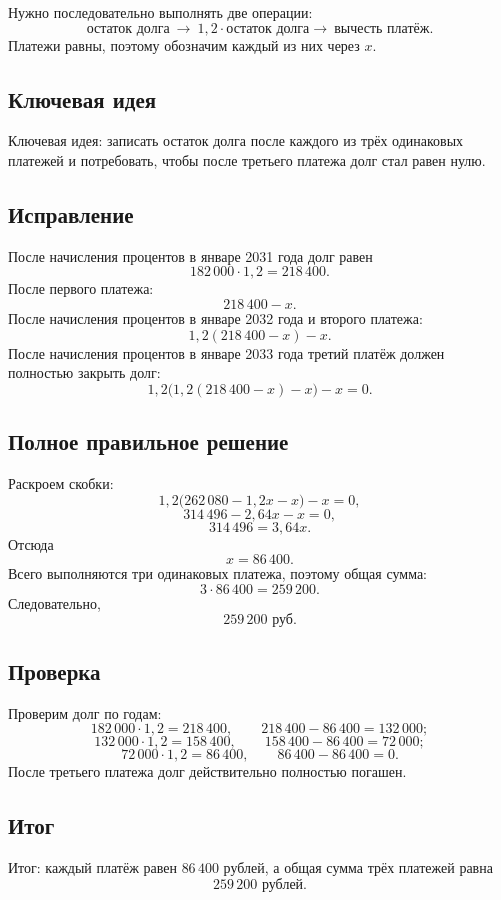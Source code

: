 \documentclass[12pt,a4paper]{article}
\begin{document}
Нужно последовательно выполнять две операции:
\[
\text{остаток долга}\ \longrightarrow\ 1{,}2\cdot\text{остаток долга}
\longrightarrow\ \text{вычесть платёж}.
\]
Платежи равны, поэтому обозначим каждый из них через $x$.

\subsection*{Ключевая идея}
\textcolor{blue!60!black}{Ключевая идея:} записать остаток долга после каждого из трёх одинаковых платежей и потребовать, чтобы после третьего платежа долг стал равен нулю.

\subsection*{Исправление}
После начисления процентов в январе 2031 года долг равен
\[
182\,000\cdot1{,}2=218\,400.
\]
После первого платежа:
\[
218\,400-x.
\]
После начисления процентов в январе 2032 года и второго платежа:
\[
1{,}2(218\,400-x)-x.
\]
После начисления процентов в январе 2033 года третий платёж должен полностью закрыть долг:
\[
1{,}2\bigl(1{,}2(218\,400-x)-x\bigr)-x=0.
\]

\subsection*{Полное правильное решение}
Раскроем скобки:
\[
1{,}2\bigl(262\,080-1{,}2x-x\bigr)-x=0,
\]
\[
314\,496-2{,}64x-x=0,
\]
\[
314\,496=3{,}64x.
\]
Отсюда
\[
x=86\,400.
\]
Всего выполняются три одинаковых платежа, поэтому общая сумма:
\[
3\cdot86\,400=259\,200.
\]
Следовательно,
\[
\boxed{259\,200\text{ руб.}}
\]

\subsection*{Проверка}
Проверим долг по годам:
\[
182\,000\cdot1{,}2=218\,400,\qquad
218\,400-86\,400=132\,000;
\]
\[
132\,000\cdot1{,}2=158\,400,\qquad
158\,400-86\,400=72\,000;
\]
\[
72\,000\cdot1{,}2=86\,400,\qquad
86\,400-86\,400=0.
\]
После третьего платежа долг действительно полностью погашен.

\subsection*{Итог}
\textcolor{teal!60!black}{Итог:} каждый платёж равен $86\,400$ рублей, а общая сумма трёх платежей равна
\[
259\,200\text{ рублей}.
\]
\end{document}

